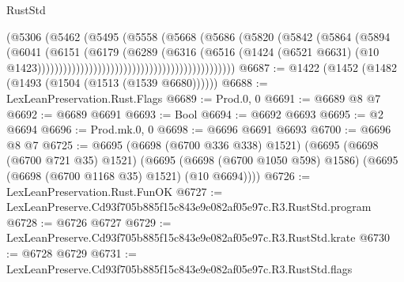 \begin{lexlean}{RustStd}
\begin{coremodule}
                                                            (@5306
                                                              (@5462
                                                                (@5495
                                                                  (@5558
                                                                    (@5668
                                                                      (@5686
                                                                        (@5820
                                                                          (@5842
                                                                            (@5864
                                                                              (@5894
                                                                                (@6041
                                                                                  (@6151
                                                                                    (@6179
                                                                                      (@6289
                                                                                        (@6316
                                                                                          (@6516
                                                                                            (@1424
                                                                                              (@6521
                                                                                                @6631)
                                                                                              (@10
                                                                                                @1423))))))))))))))))))))))))))))))))))))))))))))))
@6687 := @1422 (@1452 (@1482 (@1493 (@1504 (@1513 (@1539 @6680))))))
@6688 := LexLeanPreservation.Rust.Flags
@6689 := Prod.{0, 0}
@6691 := @6689 @8 @7
@6692 := @6689 @6691
@6693 := Bool
@6694 := @6692 @6693
@6695 := @2 @6694
@6696 := Prod.mk.{0, 0}
@6698 := @6696 @6691 @6693
@6700 := @6696 @8 @7
@6725 := @6695
    (@6698 (@6700 @336 @338) @1521)
    (@6695
      (@6698 (@6700 @721 @35) @1521)
      (@6695 (@6698 (@6700 @1050 @598) @1586) (@6695 (@6698 (@6700 @1168 @35) @1521) (@10 @6694))))
@6726 := LexLeanPreservation.Rust.FunOK
@6727 := LexLeanPreserve.Cd93f705b885f15c843e9e082af05e97c.R3.RustStd.program
@6728 := @6726 @6727
@6729 := LexLeanPreserve.Cd93f705b885f15c843e9e082af05e97c.R3.RustStd.krate
@6730 := @6728 @6729
@6731 := LexLeanPreserve.Cd93f705b885f15c843e9e082af05e97c.R3.RustStd.flags

\end{coremodule}
\end{lexlean}
